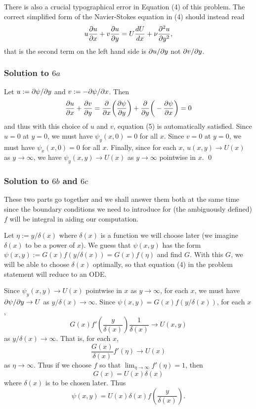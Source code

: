 There is also a crucial typographical error in Equation (4) of this problem. The correct simplified form of the Navier-Stokes equation in (4) should instead read
$$u\frac{\partial u}{\partial x} + v\frac{\partial u}{\partial y} = U\frac{dU}{dx} + \nu \frac{\partial^{2}u}{\partial y^{2}},$$
that is the second term on the left hand side is $\partial u/\partial y$ not $\partial v/\partial y$.

\subsubsection*{Solution to $6a$}
Let $u := \partial\psi/\partial y$ and $v := -\partial \psi/\partial x$. Then
\begin{align*}
\frac{\partial u}{\partial x} + \frac{\partial v}{\partial y} = \frac{\partial}{\partial x}\bigg(\frac{\partial \psi}{\partial y}\bigg) + \frac{\partial}{\partial y}\bigg(-\frac{\partial \psi}{\partial x}\bigg) = 0
\end{align*}
and thus with this choice of $u$ and $v$, equation (5) is automatically satisfied.
Since $u = 0$ at $y = 0$, we must have $\psi_{y}(x, 0) = 0$ for all $x$. Since $v = 0$ at $y = 0$, we must have $\psi_{x}(x, 0) = 0$ for all $x$.
Finally, since for each $x$, $u(x, y) \rightarrow U(x)$ as $y \rightarrow \infty$, we have $\psi_{y}(x, y) \rightarrow U(x)$ as $y \rightarrow \infty$
pointwise in $x$.
\hfill\qed

\subsubsection*{Solution to $6b$ and $6c$}
These two parts go together and we shall answer them both at the same time since the boundary conditions we need to introduce for (the ambiguously defined) $f$ will be integral in
aiding our computation.

Let $\eta := y/\delta(x)$ where $\delta(x)$ is a function we will choose later (we imagine $\delta(x)$ to be a power of $x$). We guess that $\psi(x, y)$ has the form
$\psi(x, y) := G(x)f(y/\delta(x)) = G(x)f(\eta)$ and find $G$. With this $G$, we will be able to choose $\delta(x)$ optimally, so that equation (4) in the problem statement
will reduce to an ODE.

Since $\psi_{y}(x, y) \rightarrow U(x)$ pointwise in $x$ as $y \rightarrow \infty$, for each $x$, we must have $\partial\psi/\partial y \rightarrow U$ as $y/\delta(x) \rightarrow \infty$.
Since $\psi(x, y) = G(x)f(y/\delta(x))$, for each $x$,
$$G(x)f'(\frac{y}{\delta(x)})\frac{1}{\delta(x)} \rightarrow U(x, y)$$
as $y/\delta(x) \rightarrow \infty$. That is, for each $x$,
$$\frac{G(x)}{\delta(x)}f'(\eta) \rightarrow U(x)$$
as $\eta \rightarrow \infty$.
Thus if we choose $f$ so that $\lim_{\eta \rightarrow \infty}f'(\eta) = 1$, then
$$G(x) = U(x)\delta(x)$$
where $\delta(x)$ is to be chosen later. Thus
$$\psi(x, y) = U(x)\delta(x)f(\frac{y}{\delta(x)}).$$

